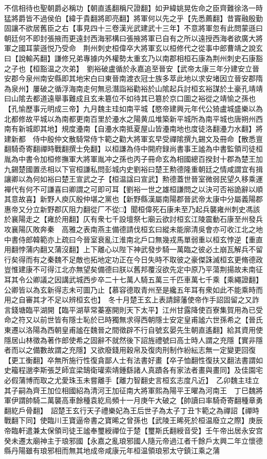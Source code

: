 不信相待也聖朝爵必稱功【朝直遙翻稱尺證翻】如尹緯姚晃佐命之臣齊難徐洛一時猛將爵皆不過侯伯【緯于貴翻將即亮翻】將軍何以先之乎【先悉薦翻】昔竇融殷勤固讓不欲居舊臣之右【事見四十三卷漢光武建武十三年】不意將軍忽有此問蒙遜曰朝廷何不即封張掖而更遠封西海邪構曰張掖將軍已自有之所以遠授西海者欲廣大將軍之國耳蒙遜悦乃受命　荆州刺史桓偉卒大將軍玄以桓修代之從事中郎曹靖之說玄曰【說輸芮翻】謙修兄弟專據内外權勢太重玄乃以南郡相桓石康為荆州刺史石康豁之子也【桓豁温之次弟】　劉裕破盧循於永嘉追至晉安【武帝太康三年分建安立晉安郡今泉州南安縣即其地宋白曰東晉南渡衣冠士族多萃此地以求安堵因立晉安郡隋為泉州】屢破之循浮海南走何無忌潛詣裕勸裕於山隂起兵討桓玄裕謀於土豪孔靖靖曰山隂去都道遠舉事難成且玄未簒位不如待其已簒於京口圖之裕從之靖愉之孫也【孔愉歷事元明成三帝】九月魏主珪如南平城【愍帝建興元年代公猗盧城盛樂以為北都修故平城以為南都更南百里於灅水之陽黄瓜堆築新平城所為南平城也唐朔州西南有新城即其地】規度灅南【自灅水南抵夏屋山皆灅南地也度徒洛翻灅力水翻】將建新都　侍中殷仲文散騎常侍卞範之勸大將軍玄早受禪隂撰九錫文及冊命【散悉亶翻騎奇寄翻禪時戰翻撰士免翻】以桓謙為侍中開府録尚書事王謐為中書監領司徒桓胤為中書令加桓修撫軍大將軍胤冲之孫也丙子冊命玄為相國總百揆封十郡為楚王加九錫楚國置丞相以下官桓謙私問彭城内史劉裕曰楚王勲德隆重朝廷之情咸謂宜有揖讓卿以為何如裕曰楚王宣武之子【桓温諡曰宣武】勲德蓋世晉室微弱民望久移乘運襌代有何不可謙喜曰卿謂之可即可耳【劉裕一世之雄桓謙問之以決可否裕詭辭以順其意故喜】新野人庾仄殷仲堪之黨也【新野縣漢屬南陽郡晉武帝太康中分屬義陽郡惠帝又分立新野郡仄阻力翻從厂不從□】聞桓偉死石康未至乃起兵襲雍州刺史馮該於襄陽走之【雍於用翻】仄有衆七千設壇祭七廟云欲討桓玄江陵震動石康至州發兵攻襄陽仄敗奔秦　高雅之表南燕主備德請伐桓玄曰縱未能廓清吳會亦可收江北之地中書侍郎韓範亦上疏曰今晉室衰亂江淮南北戶口無幾戎馬單弱重以桓玄悖逆【重直用翻悖蒲内翻又蒲沒翻】上下離心以陛下神武發步騎一萬臨之彼必土崩瓦解兵不留行矣得而有之秦魏不足敵也拓地定功正在今日失時不取彼之豪傑誅滅桓玄更脩德政豈惟建康不可得江北亦無望矣備德曰朕以舊邦覆沒欲先定中原乃平蕩荆揚故未南征耳其令公卿議之因講武城西步卒二十七萬人騎五萬三千匹車萬七千乘【乘繩證翻】公卿皆以為玄新得志未可圖乃止【慕容德取青州至是纔五年耳有衆如此不能乘時而用之自審其才不足以辨桓玄也】　冬十月楚王玄上表請歸藩使帝作手詔固留之又詐言錢塘臨平湖開【臨平湖草常蓁塞開則天下太平】江州甘露降使百寮集賀用為已受命之符又以前世皆有隱士恥於已時獨無求得西朝隱士安定皇甫謐六世孫希之【晉氏東遷以洛陽為西朝皇甫謐在魏晉之間徵辟不行自號玄晏先生朝直遙翻】給其資用使隱居山林徵為著作郎使希之固辭不就然後下詔旌禮號曰高士時人謂之充隱【實非隱者而以之備數故謂之充隱】又欲廢錢用穀帛及復肉刑制作紛紜志無一定變更回復【更工衡翻】卒無所施行性復貪鄙人士有法書好畫【卒子恤翻性復扶又翻法書謂如史籕程邈李斯張芝師宜梁鵠衛瓘索靖鍾繇諸人真蹟各有家法者畫與畫同】及佳園宅必假蒲博而取之尤愛珠玉未嘗離手【離力智翻史言桓玄志度凡近】　乙卯魏主珪立其子嗣為齊王加位相國紹為清河王加征南大將軍熙為陽平王曜為河南王　丁巳魏將軍伊謂帥騎二萬襲高車餘種袁紇烏頻十一月庚午大破之【帥讀曰率騎奇寄翻種章勇翻紇戶骨翻】　詔楚王玄行天子禮樂妃為王后世子為太子丁丑卞範之為禪詔【禪時戰翻下同】使臨川王寶逼帝書之寶晞之曾孫也【武陵王晞死於桓温廢立之際】庚辰帝臨軒遣兼太保領司徒王謐奉璽綬禪位于楚【璽斯氏翻綬音受】壬午帝出居永安宫癸未遷太廟神主于琅邪國【永嘉之亂琅邪國人隨元帝過江者千餘戶太興二年立懷德縣丹陽雖有琅邪相而無其地成帝咸康元年桓温領琅邪太守鎮江乘之蒲